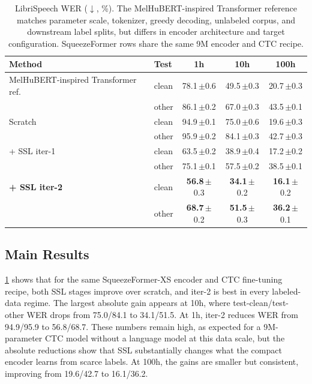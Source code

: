 \documentclass{article}
\begin{document}
\begin{table}[t]
  \caption{LibriSpeech WER ($\downarrow$, \%). The MelHuBERT-inspired
    Transformer reference matches parameter scale, tokenizer, greedy
    decoding, unlabeled corpus, and downstream label splits, but differs
    in encoder architecture and target configuration. SqueezeFormer rows
    share the same 9M encoder and CTC recipe.}
  \label{tab:main}
  \centering
  \scriptsize
  \setlength{\tabcolsep}{3.0pt}
  \renewcommand{\arraystretch}{1.08}
  \begin{tabular}{@{}p{}lccc@{}}
    \toprule
    Method & Test & \textbf{1h} & \textbf{10h} & \textbf{100h} \\
    \midrule
    MelHuBERT-inspired Transformer ref. & clean
      & 78.1{\tiny\,$\pm$0.6}
      & 49.5{\tiny\,$\pm$0.3}
      & 20.7{\tiny\,$\pm$0.3} \\
      & other
      & 86.1{\tiny\,$\pm$0.2}
      & 67.0{\tiny\,$\pm$0.3}
      & 43.5{\tiny\,$\pm$0.1} \\
    \midrule
    Scratch & clean
      & 94.9{\tiny\,$\pm$0.1}
      & 75.0{\tiny\,$\pm$0.6}
      & 19.6{\tiny\,$\pm$0.3} \\
      & other
      & 95.9{\tiny\,$\pm$0.2}
      & 84.1{\tiny\,$\pm$0.3}
      & 42.7{\tiny\,$\pm$0.3} \\
    + SSL iter-1 & clean
      & 63.5{\tiny\,$\pm$0.2}
      & 38.9{\tiny\,$\pm$0.4}
      & 17.2{\tiny\,$\pm$0.2} \\
      & other
      & 75.1{\tiny\,$\pm$0.1}
      & 57.5{\tiny\,$\pm$0.2}
      & 38.5{\tiny\,$\pm$0.1} \\
    \textbf{+ SSL iter-2} & clean
      & \textbf{56.8}{\tiny\,$\pm$0.3}
      & \textbf{34.1}{\tiny\,$\pm$0.2}
      & \textbf{16.1}{\tiny\,$\pm$0.2} \\
      & other
      & \textbf{68.7}{\tiny\,$\pm$0.2}
      & \textbf{51.5}{\tiny\,$\pm$0.3}
      & \textbf{36.2}{\tiny\,$\pm$0.1} \\
    \bottomrule
  \end{tabular}
  \vskip -0.1in
\end{table}

\subsection{Main Results}
\cref{tab:main} shows that for the same SqueezeFormer-XS encoder
and CTC fine-tuning recipe, both SSL stages improve over scratch,
and iter-2 is best in every labeled-data regime. The largest
absolute gain appears at 10h, where test-clean/test-other WER drops
from 75.0/84.1 to 34.1/51.5. At 1h, iter-2 reduces WER from
94.9/95.9 to 56.8/68.7. These numbers remain high, as expected for
a 9M-parameter CTC model without a language model at this data
scale, but the absolute reductions show that SSL substantially
changes what the compact encoder learns from scarce labels. At
100h, the gains are smaller but consistent, improving from
19.6/42.7 to 16.1/36.2.
\end{document}
